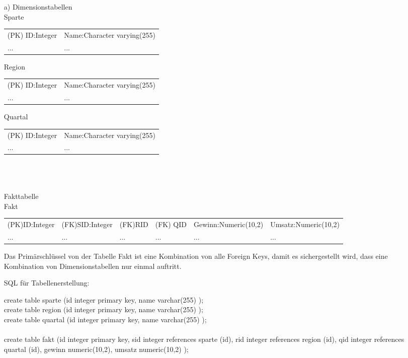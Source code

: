 \begin{enumerate}
\item[a)] 
Dimensionstabellen \\

Sparte \\
\begin{tabular}{|l|l|}
\hline
(PK) ID:Integer & Name:Character varying(255) \\
... & ... \\
\hline
\end{tabular}

Region \\
\begin{tabular}{|l|l|}
\hline
(PK) ID:Integer & Name:Character varying(255) \\
... & ... \\
\hline
\end{tabular}

Quartal \\
\begin{tabular}{|l|l|}
\hline
(PK) ID:Integer & Name:Character varying(255) \\
... & ... \\
\hline
\end{tabular} \\ \\ \\

Fakttabelle \\

Fakt \\
\begin{tabular}{|l|l|l|l|l|l|}
\hline
(PK)ID:Integer & (FK)SID:Integer & (FK)RID & (FK) QID & Gewinn:Numeric(10,2) & Umsatz:Numeric(10,2)\\
... & ... & ... & ... & ... & ...\\
\hline
\end{tabular}
Das Primärschlüssel von der Tabelle Fakt ist eine Kombination von alle Foreign Keys, damit es sichergestellt wird, dass eine Kombination von Dimensionstabellen nur einmal auftritt.

SQL für Tabellenerstellung:

create table sparte (id integer primary key, name varchar(255) ); \\
create table region (id integer primary key, name varchar(255) ); \\
create table quartal (id integer primary key, name varchar(255) ); \\ \\
%
create table fakt (id integer primary key, sid integer references sparte (id), rid integer references region (id), qid integer references quartal (id), gewinn numeric(10,2), umsatz numeric(10,2)  ); \\


\end{enumerate}
